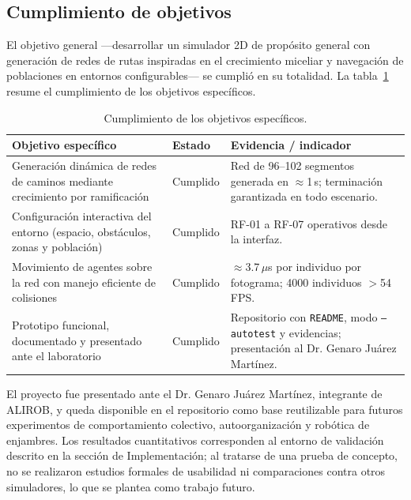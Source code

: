 \documentclass[12pt,a4paper]{article}
\begin{document}
\subsection{Cumplimiento de objetivos}

El objetivo general —desarrollar un simulador 2D de propósito general con generación de redes de rutas inspiradas en el crecimiento miceliar y navegación de poblaciones en entornos configurables— se cumplió en su totalidad. La tabla~\ref{tab:objetivos} resume el cumplimiento de los objetivos específicos.

\begin{table}[H]
    \centering
    \caption{Cumplimiento de los objetivos específicos.}
    \label{tab:objetivos}
    \begin{tabularx}{\textwidth}{p{5.5cm} p{1.8cm} X}
        \toprule
        \textbf{Objetivo específico} & \textbf{Estado} & \textbf{Evidencia / indicador} \\
        \midrule

        Generación dinámica de redes de caminos mediante crecimiento por ramificación &
        Cumplido &
        Red de 96--102 segmentos generada en $\approx$1\,s; terminación garantizada en todo escenario. \\

        Configuración interactiva del entorno (espacio, obstáculos, zonas y población) &
        Cumplido &
        RF-01 a RF-07 operativos desde la interfaz. \\

        Movimiento de agentes sobre la red con manejo eficiente de colisiones &
        Cumplido &
        $\approx$3.7\,$\mu$s por individuo por fotograma; 4000 individuos $>$54 FPS. \\

        Prototipo funcional, documentado y presentado ante el laboratorio &
        Cumplido &
        Repositorio con \texttt{README}, modo \texttt{--autotest} y evidencias; presentación al Dr. Genaro Juárez Martínez. \\

        \bottomrule
    \end{tabularx}
\end{table}

El proyecto fue presentado ante el Dr. Genaro Juárez Martínez, integrante de ALIROB, y queda disponible en el repositorio como base reutilizable para futuros experimentos de comportamiento colectivo, autoorganización y robótica de enjambres. Los resultados cuantitativos corresponden al entorno de validación descrito en la sección de Implementación; al tratarse de una prueba de concepto, no se realizaron estudios formales de usabilidad ni comparaciones contra otros simuladores, lo que se plantea como trabajo futuro.
\end{document}
